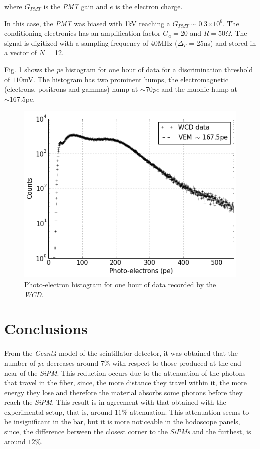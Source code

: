 \documentclass[submitting]{nst}
\begin{document}
where $G_{PMT}$ is the \textsl{PMT} gain and $e$ is the electron charge.

In this case, the \textsl{PMT} was biased with 1kV reaching a $G_{PMT}\sim$0.3$\times10^6$. The conditioning electronics has an amplification factor $G_a = 20$ and $R = 50 \Omega$. The signal is digitized with a sampling frequency of $40$MHz ($\Delta_T$ = 25ns) and stored in a vector of $N$ = 12.  

Fig. \ref{WCDpe} shows the \textsl{pe} histogram for one hour of data for a discrimination threshold of $110$mV. The histogram has two prominent humps, the electromagnetic (electrons, positrons and gammas) hump at $\sim 70$\textsl{pe} and the muonic hump at $\sim 167.5$pe.


\begin{figure}
    \centering
    \includegraphics[scale=0.45]{Figures/WCDpedata.png}
    \caption{Photo-electron histogram for one hour of data recorded by the \textsl{WCD}. }
    \label{WCDpe}
\end{figure}



\section{Conclusions}\label{sec:conclusions}%

From the \textsl{Geant4} model of the scintillator detector, it was obtained that the number of \textsl{pe} decreases around $7$\% with respect to those produced at the end near of the \textsl{SiPM}. This reduction occurs due to the attenuation of the photons that travel in the fiber, since, the more distance they travel within it, the more energy they lose and therefore the material absorbs some photons before they reach the \textsl{SiPM}. This result is in agreement with that obtained with the experimental setup, that is, around $11$\% attenuation. This attenuation seems to be insignificant in the bar, but it is more noticeable in the hodoscope panels, since, the difference between the closest corner to the \textsl{SiPMs} and the furthest, is around $12$\%.
\end{document}
